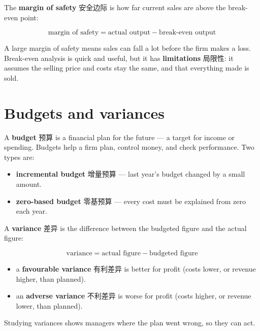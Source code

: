 \documentclass[11pt]{article}
\begin{document}
The \textbf{margin of safety} 安全边际 is how far current sales are above the break-even point:

\[
\text{margin of safety} = \text{actual output} - \text{break-even output}
\]

A large margin of safety means sales can fall a lot before the firm makes a loss. Break-even analysis is quick and useful, but it has \textbf{limitations} 局限性: it assumes the selling price and costs stay the same, and that everything made is sold.

\section*{Budgets and variances}

A \textbf{budget} 预算 is a financial plan for the future — a target for income or spending. Budgets help a firm plan, control money, and check performance. Two types are:

\begin{itemize}
\item \textbf{incremental budget} 增量预算 — last year's budget changed by a small amount.

\item \textbf{zero-based budget} 零基预算 — every cost must be explained from zero each year.

\end{itemize}

A \textbf{variance} 差异 is the difference between the budgeted figure and the actual figure:

\[
\text{variance} = \text{actual figure} - \text{budgeted figure}
\]

\begin{itemize}
\item a \textbf{favourable variance} 有利差异 is better for profit (costs lower, or revenue higher, than planned).

\item an \textbf{adverse variance} 不利差异 is worse for profit (costs higher, or revenue lower, than planned).

\end{itemize}

Studying variances shows managers where the plan went wrong, so they can act.
\end{document}
